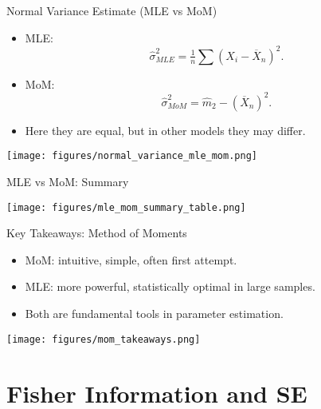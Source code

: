 \documentclass{beamer}
\newcommand{\1}{\mathbf{1}}
\begin{document}
\begin{frame}{Normal Variance Estimate (MLE vs MoM)}
  \begin{itemize}
    \item MLE:
      \[ \hat{\sigma}^2_{MLE} = \tfrac{1}{n}\sum (X_i - \overline{X}_n)^2. \]
    \item MoM:
      \[ \hat{\sigma}^2_{MoM} = \hat{m}_2 - (\overline{X}_n)^2. \]
    \item Here they are equal, but in other models they may differ.
  \end{itemize}
  \begin{center}
    \texttt{[image: figures/normal\_variance\_mle\_mom.png]}
  \end{center}
\end{frame}

\begin{frame}{MLE vs MoM: Summary}
  \begin{center}
    \texttt{[image: figures/mle\_mom\_summary\_table.png]}
  \end{center}
\end{frame}

\begin{frame}{Key Takeaways: Method of Moments}
  \begin{itemize}
    \item MoM: intuitive, simple, often first attempt.
    \item MLE: more powerful, statistically optimal in large samples.
    \item Both are fundamental tools in parameter estimation.
  \end{itemize}
  \begin{center}
    \texttt{[image: figures/mom\_takeaways.png]}
  \end{center}
\end{frame}

\section{Fisher Information and SE}
\end{document}
